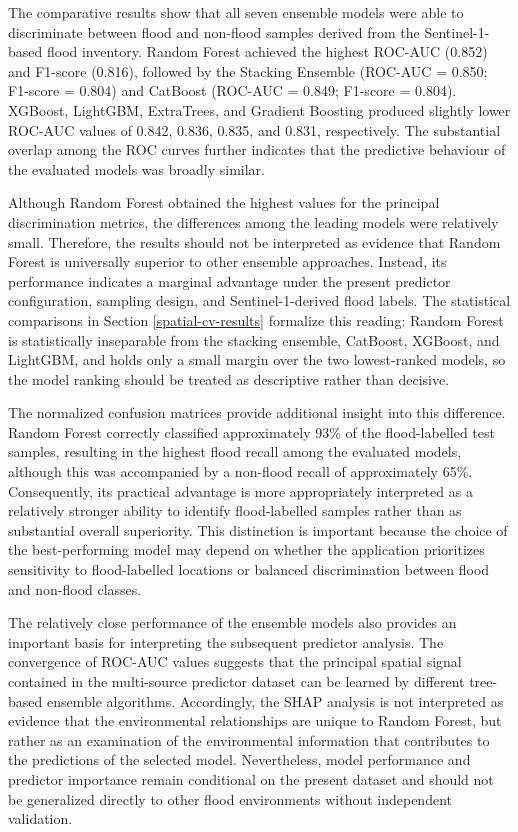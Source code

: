 \documentclass[11pt,twoside]{article}
\begin{document}
The comparative results show that all seven ensemble models were able to discriminate between flood and non-flood samples derived from the Sentinel-1-based flood inventory. Random Forest achieved the highest ROC-AUC (0.852) and F1-score (0.816), followed by the Stacking Ensemble (ROC-AUC = 0.850; F1-score = 0.804) and CatBoost (ROC-AUC = 0.849; F1-score = 0.804). XGBoost, LightGBM, ExtraTrees, and Gradient Boosting produced slightly lower ROC-AUC values of 0.842, 0.836, 0.835, and 0.831, respectively. The substantial overlap among the ROC curves further indicates that the predictive behaviour of the evaluated models was broadly similar.

Although Random Forest obtained the highest values for the principal discrimination metrics, the differences among the leading models were relatively small. Therefore, the results should not be interpreted as evidence that Random Forest is universally superior to other ensemble approaches. Instead, its performance indicates a marginal advantage under the present predictor configuration, sampling design, and Sentinel-1-derived flood labels. The statistical comparisons in Section \ref{spatial-cv-results} formalize this reading: Random Forest is statistically inseparable from the stacking ensemble, CatBoost, XGBoost, and LightGBM, and holds only a small margin over the two lowest-ranked models, so the model ranking should be treated as descriptive rather than decisive.

The normalized confusion matrices provide additional insight into this difference. Random Forest correctly classified approximately 93\% of the flood-labelled test samples, resulting in the highest flood recall among the evaluated models, although this was accompanied by a non-flood recall of approximately 65\%. Consequently, its practical advantage is more appropriately interpreted as a relatively stronger ability to identify flood-labelled samples rather than as substantial overall superiority. This distinction is important because the choice of the best-performing model may depend on whether the application prioritizes sensitivity to flood-labelled locations or balanced discrimination between flood and non-flood classes.

The relatively close performance of the ensemble models also provides an important basis for interpreting the subsequent predictor analysis. The convergence of ROC-AUC values suggests that the principal spatial signal contained in the multi-source predictor dataset can be learned by different tree-based ensemble algorithms. Accordingly, the SHAP analysis is not interpreted as evidence that the environmental relationships are unique to Random Forest, but rather as an examination of the environmental information that contributes to the predictions of the selected model. Nevertheless, model performance and predictor importance remain conditional on the present dataset and should not be generalized directly to other flood environments without independent validation.
\end{document}
